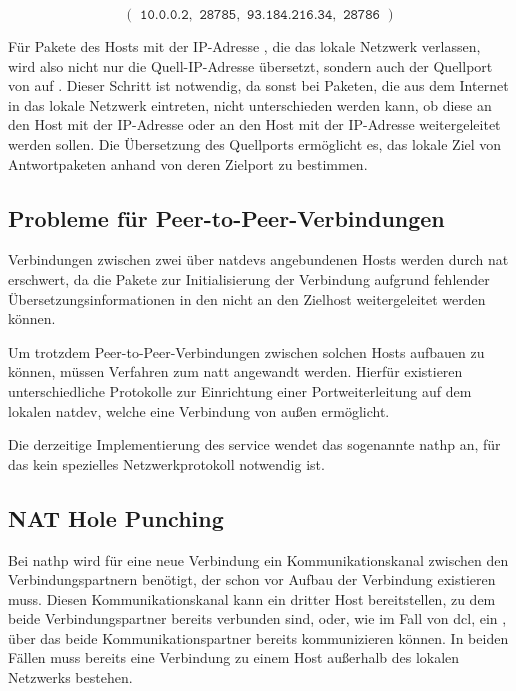 \begin{equation*}
    (\texttt{ 10.0.0.2}, \texttt{ 28785}, \texttt{ 93.184.216.34}, \texttt{ 28786 })
\end{equation*}

Für Pakete des Hosts mit der IP-Adresse , die das lokale Netzwerk
verlassen, wird also nicht nur die Quell-IP-Adresse übersetzt, sondern auch der
Quellport von  auf . Dieser Schritt ist notwendig, da
sonst bei Paketen, die aus dem Internet in das lokale Netzwerk eintreten, nicht
unterschieden werden kann, ob diese an den Host mit der IP-Adresse
 oder an den Host mit der IP-Adresse 
weitergeleitet werden sollen. Die Übersetzung des Quellports ermöglicht es,
das lokale Ziel von Antwortpaketen anhand von deren Zielport zu bestimmen.


\subsection{Probleme für Peer-to-Peer-Verbindungen}
Verbindungen zwischen zwei über \glspl{natdev} angebundenen Hosts werden durch
\acrlong{nat} erschwert, da die Pakete zur Initialisierung der Verbindung
aufgrund fehlender Übersetzungsinformationen in den
 nicht an den Zielhost weitergeleitet werden
können.

Um trotzdem Peer-to-Peer-Verbindungen zwischen solchen Hosts aufbauen zu können,
müssen Verfahren zum \gls{natt} angewandt werden.
Hierfür existieren unterschiedliche Protokolle zur Einrichtung einer
Portweiterleitung auf dem lokalen \gls{natdev}, welche eine Verbindung von außen
ermöglicht.

Die derzeitige Implementierung des \gls{service} wendet das sogenannte
\gls{nathp} an, für das kein spezielles Netzwerkprotokoll notwendig ist.

\subsection{NAT Hole Punching}
Bei \gls{nathp} wird für eine neue Verbindung ein Kommunikationskanal zwischen
den Verbindungspartnern benötigt, der schon vor Aufbau der Verbindung existieren
muss.
Diesen Kommunikationskanal kann ein dritter Host bereitstellen, zu dem beide
Verbindungspartner bereits verbunden sind, oder, wie im Fall von \gls{dcl},
ein , über das beide Kommunikationspartner bereits
kommunizieren können.
In beiden Fällen muss bereits eine Verbindung zu einem Host außerhalb des
lokalen Netzwerks bestehen.


